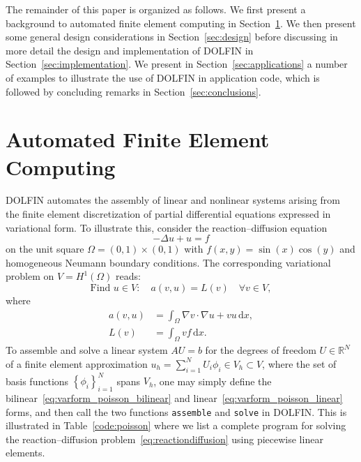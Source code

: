 \documentclass[acmtoms]{acmtrans2m}
\newcommand{\brac}[1]{\left( {#1} \right)}
\newcommand{\bracc}[1]{\left\{ {#1} \right\}}
\newcommand{\dx}{\,\mathrm{d}x}
\newcommand{\R}{\mathbb{R}}
\newcommand{\emp}[1]{\texttt{#1}}
\newcommand{\dolfin}{DOLFIN}
\begin{document}
The remainder of this paper is organized as follows. We first present
a background to automated finite element computing in
Section~\ref{sec:automation}. We then present some general design
considerations in Section~\ref{sec:design} before discussing in more detail
the
design and implementation of \dolfin{} in
Section~\ref{sec:implementation}. We present in
Section~\ref{sec:applications} a number of examples to illustrate the
use of \dolfin{} in application code, which is followed by concluding
remarks in Section~\ref{sec:conclusions}.

\section{Automated Finite Element Computing}
\label{sec:automation}

\dolfin{} automates the assembly of linear and nonlinear systems
arising from the finite element discretization of partial differential
equations expressed in variational form. To illustrate this, consider
the reaction--diffusion equation
\begin{equation} \label{eq:reactiondiffusion}
  -\Delta u + u = f
\end{equation}
on the unit square $\Omega = (0,1) \times (0,1)$ with $f(x, y) =
\sin(x)\cos(y)$ and homogeneous Neumann boundary conditions. The
corresponding variational problem on $V = H^{1}(\Omega)$ reads:
\begin{equation}
  \mbox{Find } u \in V : \quad a\brac{v, u} = L\brac{v} \quad \forall v \in V,
\label{eq:varproblem}
\end{equation}
where
\begin{align}
  a(v, u) &= \int_{\Omega} \nabla v \cdot \nabla u + v u \dx,
  \label{eq:varform_poisson_bilinear}
  \\
  L(v) &= \int_{\Omega} v f \dx.
  \label{eq:varform_poisson_linear}
\end{align}
To assemble and solve a linear system $A U = b$ for the degrees of
freedom $U\in\R^N$ of a finite element approximation $u_h =
\sum_{i=1}^N U_i \phi_i \in V_h \subset V$, where the set of basis
functions $\bracc{\phi_{i}}_{i=1}^N$ spans $V_{h}$, one
may simply define the bilinear~\eqref{eq:varform_poisson_bilinear} and
linear~\eqref{eq:varform_poisson_linear} forms, and then call the two
functions \emp{assemble} and \emp{solve} in \dolfin{}. This is illustrated in
Table~\ref{code:poisson} where we list a complete program for solving
the reaction--diffusion problem~\eqref{eq:reactiondiffusion} using
piecewise linear elements.
\end{document}
